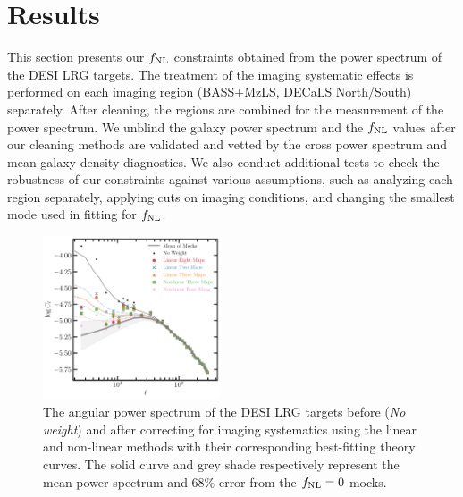 \section{Results}\label{sec:results}
This section presents our $f_{\rm NL}$ constraints obtained from the power spectrum of the DESI LRG targets. The treatment of the imaging systematic effects is performed on each imaging region (BASS+MzLS, DECaLS North/South) separately. After cleaning, the regions are combined for the measurement of the power spectrum. We unblind the galaxy power spectrum and the $f_{\rm NL}$ values after our cleaning methods are validated and vetted by the cross power spectrum and mean galaxy density diagnostics. We also conduct additional tests to check the robustness of our constraints against various assumptions, such as analyzing each region separately, applying cuts on imaging conditions, and changing the smallest mode used in fitting for $f_{\rm NL}$.


\begin{figure}
    \centering
    \includegraphics[width=0.47\textwidth]{figures/model_dr9.pdf} 
    \caption{The angular power spectrum of the DESI LRG targets before (\textit{No weight}) and after correcting for imaging systematics using the linear and non-linear methods with their corresponding best-fitting theory curves. The solid curve and grey shade respectively represent the mean power spectrum and $68\%$ error from the $f_{\rm NL}=0$ mocks.}
    \label{fig:cl_dr9}
\end{figure}


